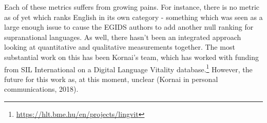 Each of these metrics suffers from growing pains. For instance, there is no metric as of yet which ranks English in its own category - something which was seen as a large enough issue to cause the EGIDS authors to add another null ranking for supranational languages. %
As well, there hasn't been an integrated approach looking at quantitative and qualitative measurements together. The most substantial work on this has been Kornai's team, which has worked with funding from SIL International on a Digital Language Vitality database.\footnote{\href{https://hlt.bme.hu/en/projects/lingvit}{https://hlt.bme.hu/en/projects/lingvit}} However, the future for this work as, at this moment, unclear (Kornai in personal communications, 2018).



